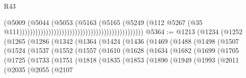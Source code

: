 \begin{lexlean}{R43}
\begin{coremodule}
                                                                                  (@5009
                                                                                    (@5044
                                                                                      (@5053
                                                                                        (@5163
                                                                                          (@5165
                                                                                            (@5249
                                                                                              (@112
                                                                                                @5267
                                                                                                (@35
                                                                                                  @111)))))))))))))))))))))))))))))))))))))))))))))))
@5364 := @1213
    (@1234
      (@1252
        (@1265
          (@1286
            (@1342
              (@1364
                (@1424
                  (@1436
                    (@1469
                      (@1488
                        (@1498
                          (@1507
                            (@1524
                              (@1537
                                (@1552
                                  (@1557
                                    (@1610
                                      (@1628
                                        (@1634
                                          (@1682
                                            (@1699
                                              (@1705
                                                (@1725
                                                  (@1733
                                                    (@1751
                                                      (@1818
                                                        (@1835
                                                          (@1853
                                                            (@1890
                                                              (@1949
                                                                (@1993
                                                                  (@2011
                                                                    (@2035
                                                                      (@2055
                                                                        (@2107

\end{coremodule}
\end{lexlean}
